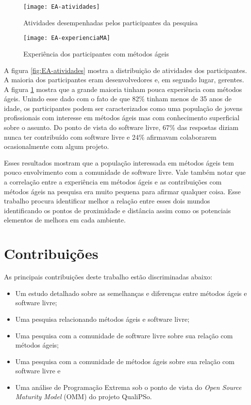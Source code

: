 
\begin{figure}[htb]
  \begin{minipage}[t]{0.5\linewidth}
    \centering
    \texttt{[image: EA-atividades]}
    \caption{Atividades desempenhadas pelos participantes da pesquisa}
    \label{fig:EA-atividades}
  \end{minipage}
  \begin{minipage}[t]{0.5\linewidth}
    \centering
    \texttt{[image: EA-experienciaMA]}
    \caption{Experiência dos participantes com métodos ágeis}
    \label{fig:EA-experienciaMA}
  \end{minipage}
\end{figure}

A figura \ref{fig:EA-atividades} mostra a distribuição de atividades
dos participantes. A maioria dos participantes eram desenvolvedores e,
em segundo lugar, gerentes. A figura \ref{fig:EA-experienciaMA} mostra
que a grande maioria tinham pouca experiência com métodos
ágeis. Unindo esse dado com o fato de que 82\% tinham menos de 35 anos
de idade, os participantes podem ser caracterizados como uma população
de jovens profissionais com interesse em métodos ágeis mas com
conhecimento superficial sobre o assunto. Do ponto de vista do
software livre, 67\% das respostas diziam nunca ter contribuído com
software livre e 24\% afirmavam colaborarem ocasionalmente com algum
projeto.

Esses resultados mostram que a população interessada em métodos ágeis
tem pouco envolvimento com a comunidade de software livre. Vale também
notar que a correlação entre a experiência em métodos ágeis e as
contribuições com métodos ágeis na pesquisa era muito pequena para
afirmar qualquer coisa. Esse trabalho procura identificar melhor a
relação entre esses dois mundos identificando os pontos de proximidade
e distância assim como os potenciais elementos de melhora em cada
ambiente.

\section{Contribuições}
\label{sec:contribucoes}

As principais contribuições deste trabalho estão discriminadas abaixo:

\begin{itemize}
\item Um estudo detalhado sobre as semelhanças e diferenças entre
  métodos ágeis e software livre;
\item Uma pesquisa relacionando métodos ágeis e software livre;
\item Uma pesquisa com a comunidade de software livre sobre sua
  relação com métodos ágeis;
\item Uma pesquisa com a comunidade de métodos ágeis sobre sua relação
  com software livre e
\item Uma análise de Programação Extrema \cite{XP01} sob o ponto de
  vista do \emph{Open Source Maturity Model} (OMM) do projeto
  QualiPSo.
\end{itemize}

